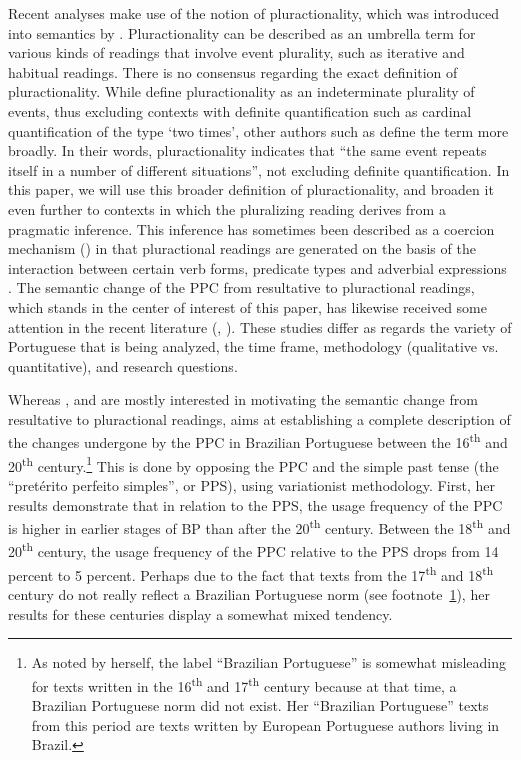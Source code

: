 \documentclass[output=paper,colorlinks,citecolor=brown]{langscibook}
\begin{document}
Recent analyses make use of the notion of pluractionality, which was introduced into semantics by \citet{Lasersohn1995}. Pluractionality can be described as an umbrella term for various kinds of readings that involve event plurality, such as iterative and habitual readings. There is no consensus regarding the exact definition of pluractionality. While \citet[83--84]{CabredoHofherrCarvalho2010} define pluractionality as an indeterminate plurality of events, thus excluding contexts with definite quantification such as cardinal quantification of the type ‘two times’, other authors such as \citet{BertinettoLenci2012} define the term more broadly. In their words, pluractionality indicates that “the same event repeats itself in a number of different situations”, not excluding definite quantification. In this paper, we will use this broader definition of pluractionality, and broaden it even further to contexts in which the pluralizing reading derives from a pragmatic inference. This inference has sometimes been described as a coercion mechanism (\cite{Pustejovsky1995, Michaelis2004}) in that pluractional readings are generated on the basis of the interaction between certain verb forms, predicate types and adverbial expressions \parencite{Laca2006}.
The semantic change of the PPC from resultative to pluractional readings, which stands in the center of interest of this paper, has likewise received some attention in the recent literature (\cite{Barbosa2014, AmaralHowe2012, Becker2017}, \cite[486--493]{Olbertz2018}). These studies differ as regards the variety of Portuguese that is being analyzed, the time frame, methodology (qualitative vs. quantitative), and research questions. 

Whereas \citet{AmaralHowe2012, Becker2017, Olbertz2018}, and \citet{Becker2020} are mostly interested in motivating the semantic change from resultative to pluractional readings, \citet{Barbosa2014} aims at establishing a complete description of the changes undergone by the PPC in Brazilian Portuguese between the 16\textsuperscript{th} and 20\textsuperscript{th} century.\footnote{\label{fn:rb2}As noted by \citet[85, fn 1]{Barbosa2014} herself, the label “Brazilian Portuguese” is somewhat misleading for texts written in the 16\textsuperscript{th} and 17\textsuperscript{th} century because at that time, a Brazilian Portuguese norm did not exist. Her “Brazilian Portuguese” texts from this period are texts written by European Portuguese authors living in Brazil.}  This is done by opposing the PPC and the simple past tense (the “pretérito perfeito simples”, or PPS), using variationist methodology. First, her results demonstrate that in relation to the PPS, the usage frequency of the PPC is higher in earlier stages of BP than after the 20\textsuperscript{th} century. Between the 18\textsuperscript{th} and 20\textsuperscript{th} century, the usage frequency of the PPC relative to the PPS drops from 14 percent to 5 percent. Perhaps due to the fact that texts from the 17\textsuperscript{th} and 18\textsuperscript{th} century do not really reflect a Brazilian Portuguese norm (see footnote~\ref{fn:rb2}), her results for these centuries display a somewhat mixed tendency. 
\end{document}
